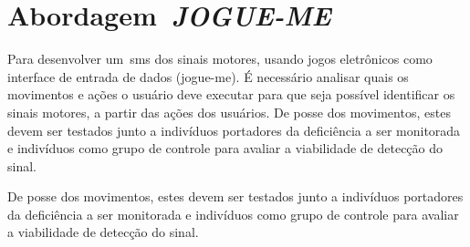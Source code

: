 \chapter{Abordagem~\textit{JOGUE-ME}}\label{chapter:abordagem_gahme}
Para desenvolver um~\ac{sms} dos sinais motores, usando jogos eletrônicos como interface de entrada de dados (\ac{jogue-me}). É necessário analisar quais os movimentos e ações o usuário deve executar para que seja possível identificar os sinais motores, a partir das ações dos usuários. De posse dos movimentos, estes devem ser testados junto a indivíduos portadores da deficiência a ser monitorada e indivíduos como grupo de controle para avaliar a viabilidade de detecção do sinal.

De posse dos movimentos, estes devem ser testados junto a indivíduos portadores da deficiência a ser monitorada e indivíduos como grupo de controle para avaliar a viabilidade de detecção do sinal.








%


